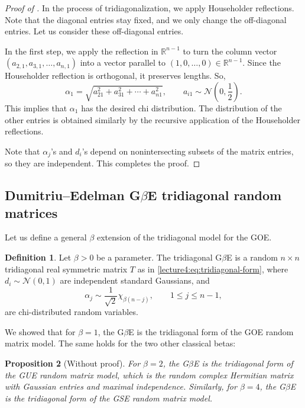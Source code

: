 \documentclass[letterpaper,11pt,oneside,reqno]{book}
\numberwithin{equation}{chapter}  %
\newtheorem{proposition}{Proposition}[chapter]  %
\theoremstyle{definition}
\newtheorem{definition}[proposition]{Definition}
\begin{document}
\begin{proof}[Proof of ]
	In the process of tridiagonalization,
	we apply Householder reflections.
	Note that the diagonal entries stay fixed,
	and we only change the off-diagonal entries.
	Let us consider these off-diagonal entries.

	In the first step, we apply the reflection in $\mathbb{R}^{n-1}$
	to turn the column vector $(a_{2,1},a_{3,1},\ldots,a_{n,1} )$ into
	a vector parallel to $(1,0,\ldots,0)\in \mathbb{R}^{n-1}$.
	Since the Householder reflection is orthogonal,
	it preserves lengths. So,
	\begin{equation*}
		\alpha_1=\sqrt{a_{21}^2+a_{31}^2+\cdots+a_{n1}^2},\qquad a_{i1}\sim
		\mathcal{N}(0,\dfrac{1}{2}).
	\end{equation*}
	This implies that $\alpha_1$ has the desired chi distribution.
	The distribution of the other entries is obtained similarly by the recursive
	application of the Householder reflections.

	Note that $\alpha_j$'s and $d_i$'s depend on nonintersecting
	subsets of the matrix entries, so they are independent. This completes the proof.
\end{proof}



\subsection{Dumitriu--Edelman G\texorpdfstring{\(\beta\)}{beta}E tridiagonal random matrices}

Let us define a general $\beta$ extension of the tridiagonal model for the
GOE.

\begin{definition}
	\label{lecture4:def:tridiagonal-model-general-beta}
	Let $\beta>0$ be a parameter.
	The tridiagonal G$\beta$E is a random $n\times n$
	tridiagonal real symmetric
	matrix $T$ as in
	\eqref{lecture4:eq:tridiagonal-form},
	where $d_i\sim \mathcal{N}(0,1)$ are independent standard Gaussians,
	and
	\begin{equation*}
		\alpha_j\sim \frac{1}{\sqrt 2}\chi_{\beta(n-j)},\qquad
		1\le j\le n-1,
	\end{equation*}
	are chi-distributed random variables.
\end{definition}

We showed that for $\beta=1$,
the G$\beta$E is the tridiagonal form of the GOE random matrix model.
The same holds for the two other classical betas:
\begin{proposition}[Without proof]
	\label{lecture4:prop:tridiagonal-model-beta-classical}
	For $\beta=2$, the G$\beta$E is the tridiagonal form of the GUE random matrix model,
	which is the random complex Hermitian matrix with Gaussian entries and maximal
	independence. Similarly, for $\beta=4$,
	the G$\beta$E is the tridiagonal form of the GSE random matrix model.
\end{proposition}
\end{document}
